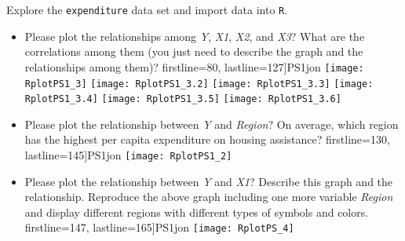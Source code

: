 \documentclass[12pt,letterpaper]{article}
\begin{document}
	\vspace{.5cm}
	\noindent Explore the \texttt{expenditure} data set and import data into \texttt{R}.
	\vspace{.5cm}
	  
	\vspace{.5cm}
	\begin{itemize}
		
		\item
		Please plot the relationships among \emph{Y}, \emph{X1}, \emph{X2}, and \emph{X3}? What are the correlations among them (you just need to describe the graph and the relationships among them)?
		\vspace{.5cm}
			 firstline=80, lastline=127]{PS1jon}
				\vspace{.5cm}
			\texttt{[image: RplotPS1\_3]}
			\texttt{[image: RplotPS1\_3.2]}
			\texttt{[image: RplotPS1\_3.3]}
			\texttt{[image: RplotPS1\_3.4]}
			\texttt{[image: RplotPS1\_3.5]}
			\texttt{[image: RplotPS1\_3.6]}
			\vspace{.5cm}
		\item
		Please plot the relationship between \emph{Y} and \emph{Region}? On average, which region has the highest per capita expenditure on housing assistance?
		\vspace{.5cm}
			 firstline=130, lastline=145]{PS1jon}
				\vspace{.5cm}
			\texttt{[image: RplotPS1\_2]}
			\vspace{.5cm}
		\item
		Please plot the relationship between \emph{Y} and \emph{X1}? Describe this graph and the relationship. Reproduce the above graph including one more variable \emph{Region} and display different regions with different types of symbols and colors.
		\vspace{.5cm}
			 firstline=147, lastline=165]{PS1jon}
			\vspace{.5cm}
			\texttt{[image: RplotPS\_4]}
	
	\end{itemize}
	
	
\end{document}
